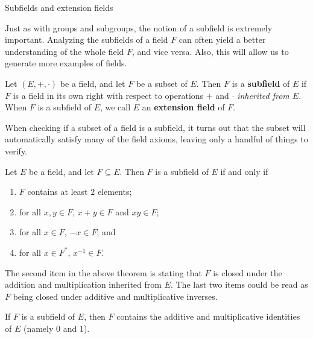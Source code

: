\begin{section}{Subfields and extension fields}

Just as with groups and subgroups, the notion of a subfield is extremely important. Analyzing the subfields of a field $F$ can often yield a better understanding of the whole field $F$, and vice versa. Also, this will allow us to generate  more examples of fields.

\begin{definition}
Let $(E,+,\cdot)$ be a field, and let $F$ be a subset of $E$. Then $F$ is a \textbf{subfield} of $E$ if $F$ is a field in its own right with respect to operations $+$ and $\cdot$ \emph{inherited from $E$}. When $F$ is a subfield of $E$, we call $E$  an \textbf{extension field} of $F$.
\end{definition}

When checking if a subset of a field is a subfield, it turns out that the subset will automatically satisfy many of the field axioms, leaving only a handful of things to verify.

\begin{theorem}
Let $E$ be a field, and let $F\subseteq E$. Then $F$ is a subfield of $E$ if and only if 
\begin{enumerate}
\item $F$ contains at least $2$ elements;
\item for all $x,y\in F$, $x+y\in F$ and  $xy\in F$;
\item for all $x\in F$, $-x\in F$; and 
\item for all $x\in F^*$, $x^{-1}\in F$.
\end{enumerate}
\end{theorem}

The second item in the above theorem is stating that $F$ is closed under the addition and multiplication inherited from $E$. The last two items could be read as $F$ being closed under additive and multiplicative inverses.

\begin{theorem}\label{thm.SubfieldContains01}
If $F$ is a subfield of $E$, then $F$ contains the additive and multiplicative identities of $E$ (namely $0$ and $1$).
\end{theorem}


\end{section}
